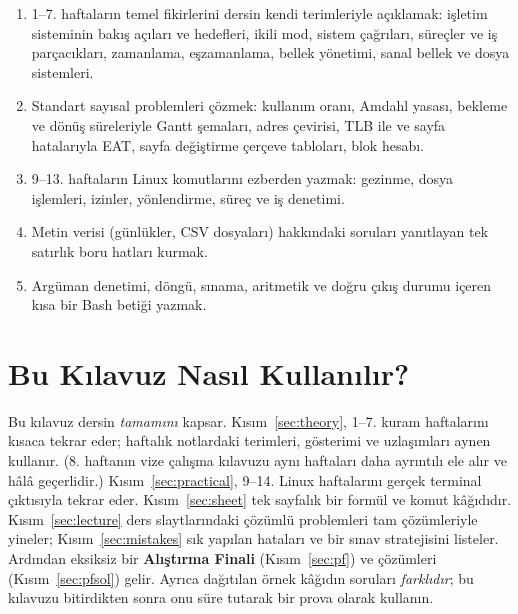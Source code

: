 \documentclass[11pt,a4paper]{article}
\begin{document}
\vspace{0.8em}
\begin{keyidea}
\begin{enumerate}[leftmargin=1.4em]
  \item 1--7. haftaların temel fikirlerini dersin kendi terimleriyle açıklamak: işletim sisteminin bakış açıları ve hedefleri, ikili mod, sistem çağrıları, süreçler ve iş parçacıkları, zamanlama, eşzamanlama, bellek yönetimi, sanal bellek ve dosya sistemleri.
  \item Standart sayısal problemleri çözmek: kullanım oranı, Amdahl yasası, bekleme ve dönüş süreleriyle Gantt şemaları, adres çevirisi, TLB ile ve sayfa hatalarıyla EAT, sayfa değiştirme çerçeve tabloları, blok hesabı.
  \item 9--13. haftaların Linux komutlarını ezberden yazmak: gezinme, dosya işlemleri, izinler, yönlendirme, süreç ve iş denetimi.
  \item Metin verisi (günlükler, CSV dosyaları) hakkındaki soruları yanıtlayan tek satırlık boru hatları kurmak.
  \item Argüman denetimi, döngü, sınama, aritmetik ve doğru çıkış durumu içeren kısa bir Bash betiği yazmak.
\end{enumerate}
\end{keyidea}

\setcounter{tocdepth}{1}
\tableofcontents

\section{Bu Kılavuz Nasıl Kullanılır?}

Bu kılavuz dersin \emph{tamamını} kapsar. Kısım~\ref{sec:theory}, 1--7. kuram haftalarını kısaca tekrar eder; haftalık notlardaki terimleri, gösterimi ve uzlaşımları aynen kullanır. (8. haftanın vize çalışma kılavuzu aynı haftaları daha ayrıntılı ele alır ve hâlâ geçerlidir.) Kısım~\ref{sec:practical}, 9--14. Linux haftalarını gerçek terminal çıktısıyla tekrar eder. Kısım~\ref{sec:sheet} tek sayfalık bir formül ve komut kâğıdıdır. Kısım~\ref{sec:lecture} ders slaytlarındaki çözümlü problemleri tam çözümleriyle yineler; Kısım~\ref{sec:mistakes} sık yapılan hataları ve bir sınav stratejisini listeler. Ardından eksiksiz bir \textbf{Alıştırma Finali} (Kısım~\ref{sec:pf}) ve çözümleri (Kısım~\ref{sec:pfsol}) gelir. Ayrıca dağıtılan örnek kâğıdın soruları \emph{farklıdır}; bu kılavuzu bitirdikten sonra onu süre tutarak bir prova olarak kullanın.
\end{document}
